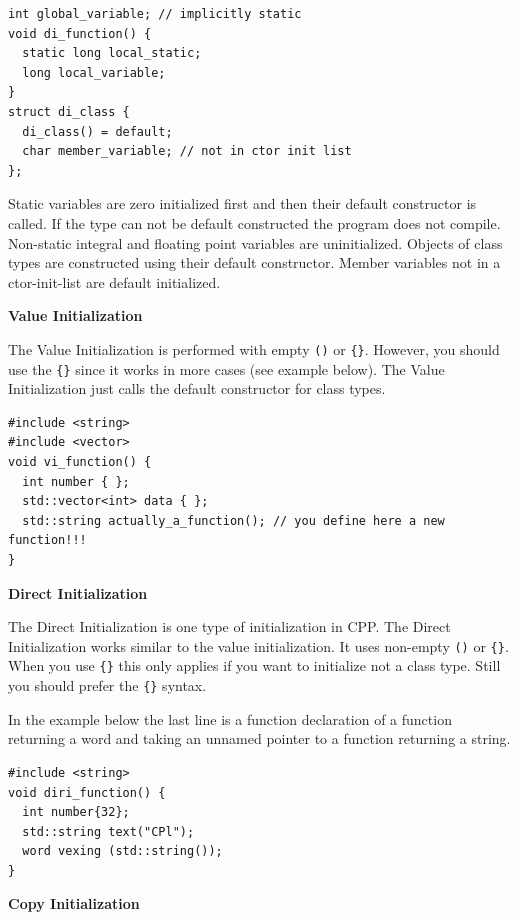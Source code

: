 \documentclass[11pt,twoside,landscape]{article}
\begin{document}
\begin{multicols}{3}
\lstset{language=c++,label= ,caption= ,captionpos=b,numbers=none}
\begin{lstlisting}
int global_variable; // implicitly static
void di_function() {
  static long local_static;
  long local_variable;
}
struct di_class {
  di_class() = default;
  char member_variable; // not in ctor init list
};
\end{lstlisting}

Static variables are zero initialized first and then their default constructor is called.
If the type can not be default constructed the program does not compile.
Non-static integral and floating point variables are uninitialized.
Objects of class types are constructed using their default constructor.
Member variables not in a ctor-init-list are default initialized.

\textbf{Value Initialization}

The Value Initialization is performed with empty \texttt{()} or \texttt{\{\}}.
However, you should use the \texttt{\{\}} since it works in more cases (see example below).
The Value Initialization just calls the default constructor for class types.

\lstset{language=c++,label= ,caption= ,captionpos=b,numbers=none}
\begin{lstlisting}
#include <string>
#include <vector>
void vi_function() {
  int number { };
  std::vector<int> data { };
  std::string actually_a_function(); // you define here a new function!!!
}
\end{lstlisting}

\textbf{Direct Initialization}

The Direct Initialization is one type of initialization in CPP.
The Direct Initialization works similar to the value initialization.
It uses non-empty \texttt{()} or \texttt{\{\}}.
When you use \texttt{\{\}} this only applies if you want to initialize not a class type.
Still you should prefer the \texttt{\{\}} syntax.

In the example below the last line is a function declaration of a function returning a word and taking an unnamed pointer to a function returning a string.

\lstset{language=c++,label= ,caption= ,captionpos=b,numbers=none}
\begin{lstlisting}
#include <string>
void diri_function() {
  int number{32};
  std::string text("CPl");
  word vexing (std::string()); 
}
\end{lstlisting}

\textbf{Copy Initialization}


\end{multicols}
\end{document}
